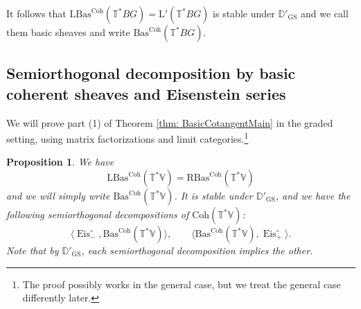 \documentclass{amsart}
\newtheorem{proposition}[theorem]{Proposition}
\theoremstyle{definition}
\theoremstyle{remark}
\numberwithin{equation}{section}
\newcommand{\D}{\mathbb{D}}
\DeclareMathOperator{\Eis}{\mathrm{Eis}}
\newcommand{\Coh}{\mathrm{Coh}}
\newcommand{\GS}{\mathrm{GS}}
\newcommand{\V}{\mathbb{V}}
\newcommand{\T}{\mathbb{T}}
\newcommand{\RBas}{\mathrm{RBas}}
\newcommand{\LBas}{\mathrm{LBas}}
\newcommand{\Bas}{\mathrm{Bas}}
\newcommand{\mrL}{\mathrm{L}}
\begin{document}
It follows that $\LBas^\Coh(\T^* BG)=\mrL' (\T^* BG)$ is stable under $\D'_{\GS}$ and we call them basic sheaves and write $\Bas^\Coh(\T^* BG)$. 

\subsection{Semiorthogonal decomposition by basic coherent sheaves and Eisenstein series}{\label{ss: cotangenbybasic}}
We will prove part (1) of Theorem \ref{thm: BasicCotangentMain} in the graded setting, using matrix factorizations and limit categories.\footnote{The proof possibly works in the general case, but we treat the general case differently later.} 

\begin{proposition}{\label{prop: cotanbascohSOD}}
    We have 
    \[
    \LBas^\Coh(\T^*\V)=\RBas^\Coh(\T^*\V)
    \]
    and we will simply write $\Bas^\Coh(\T^*\V)$. It is stable under $\D'_\GS$, and we have the following semiorthogonal decompositions of $\Coh(\T^{\ast}\V)$:
    \begin{equation*}
        \langle  \Eis^{\circ}_-,  \Bas^{\Coh}(\T^{\ast}\V) \rangle,  \qquad \langle \Bas^{\Coh}(\T^{\ast}\V),  \Eis^{\circ}_+\rangle.
    \end{equation*}
Note that by $\D'_{\GS}$, each semiorthogonal decomposition implies the other. 
\end{proposition}
\end{document}
